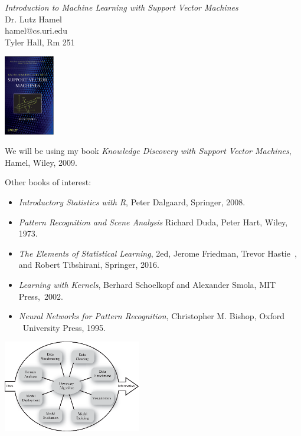 \documentclass[a4paper,blends,pdf,colorBG,slideColor]{prosper}
\begin{document}
\begin{center}
	{\LARGE\em Introduction to Machine Learning with Support Vector Machines}\\

	Dr. Lutz Hamel\\
	hamel@cs.uri.edu\\
	Tyler Hall, Rm 251\\
	\vspace{.3in}

    \includegraphics[height=35mm]{images/bookcover.eps}
\end{center}

\es


We will be using my book {\em Knowledge Discovery with Support Vector Machines}, Hamel, Wiley, 2009.

Other books of interest:
\begin{itemize}
\item
{\em Introductory Statistics with R}, Peter Dalgaard, Springer, 2008.
\item
{\em Pattern Recognition and Scene Analysis}
Richard Duda, Peter Hart, Wiley, 1973.
\item
{\em The Elements of Statistical Learning}, 2ed, Jerome Friedman, Trevor Hastie\
, and Robert Tibshirani, Springer, 2016.
\item
{\em Learning with Kernels}, Berhard Schoelkopf and Alexander Smola, MIT Press,\
 2002.
\item
{\em  Neural Networks for Pattern Recognition},  Christopher M. Bishop, Oxford \
University Press, 1995.
\end{itemize}
\es

\begin{center}
    \includegraphics[height=40mm]{figures/fig01-01.eps}
\end{center}
\end{document}
